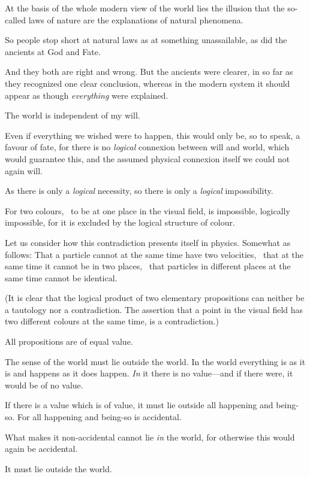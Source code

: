 {At the basis of the whole modern view of
the world lies the illusion that the so-called
laws of nature are the explanations of natural
phenomena.}


{So people stop short at natural laws as at something
unassailable, as did the ancients at God
and Fate.

And they both are right and wrong. But the
ancients were clearer, in so far as they recognized
one clear conclusion, whereas in the modern
system it should appear as though \emph{everything} were
explained.}


{The world is independent of my will.}


{Even if everything we wished were to happen,
this would only be, so to speak, a favour of
fate, for there is no \emph{logical} connexion between will
and world, which would guarantee this, and the
assumed physical connexion itself we could not
again will.}


{As there is only a \emph{logical} necessity, so there is
only a \emph{logical} impossibility.}


{For two colours, \exempliGratia\ to be at one place in the
visual field, is impossible, logically impossible,
for it is excluded by the logical structure of
colour.

Let us consider how this contradiction presents
itself in physics. Somewhat as follows: That a
particle cannot at the same time have two velocities,
\idEst\ that at the same time it cannot be in
two places, \idEst\ that particles in different places
at the same time cannot be identical.

(It is clear that the logical product of two
elementary propositions can neither be a tautology
nor a contradiction. The assertion that a point
in the visual field has two different colours at the
same time, is a contradiction.)}


{All propositions are of equal value.}


{The sense of the world must lie outside the
world. In the world everything is as it is and
happens as it does happen. \emph{In} it there is no value---and
\enlargethispage{11pt} %
if there were, it would be of no value.

If there is a value which is of value, it must
lie outside all happening and being-so. For all
happening and being-so is accidental.

What makes it non-accidental cannot lie \emph{in}
the world, for otherwise this would again be accidental.

It must lie outside the world.}


